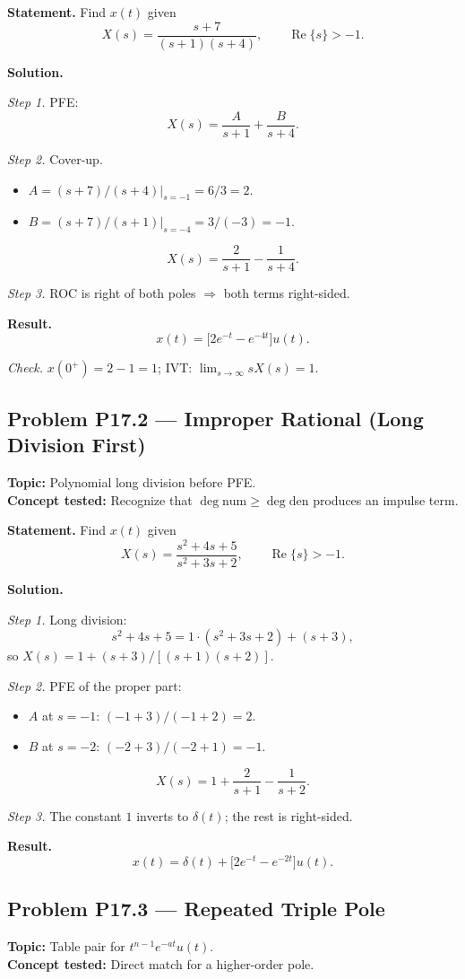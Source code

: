 \documentclass[11pt]{article}
\newcommand{\Real}{\operatorname{Re}}
\begin{document}
\textbf{Statement.} Find $x(t)$ given
\[
X(s) = \frac{s+7}{(s+1)(s+4)},\qquad \Real\{s\}>-1.
\]

\textbf{Solution.}

\textit{Step 1.} PFE:
\[
X(s) = \frac{A}{s+1}+\frac{B}{s+4}.
\]

\textit{Step 2.} Cover-up.
\begin{itemize}
\item $A = (s+7)/(s+4)\big|_{s=-1} = 6/3 = 2$.
\item $B = (s+7)/(s+1)\big|_{s=-4} = 3/(-3) = -1$.
\end{itemize}
\[
X(s) = \frac{2}{s+1} - \frac{1}{s+4}.
\]

\textit{Step 3.} ROC is right of both poles $\Rightarrow$ both terms right-sided.

\textbf{Result.}
\[
\boxed{\,x(t) = \bigl[2e^{-t} - e^{-4t}\bigr]u(t).\,}
\]

\textit{Check.} $x(0^{+}) = 2-1 = 1$; IVT: $\lim_{s\to\infty}sX(s) = 1$. \checkmark

\subsection{Problem P17.2 --- Improper Rational (Long Division First)}
\textbf{Topic:} Polynomial long division before PFE.\\
\textbf{Concept tested:} Recognize that $\deg\text{num}\ge\deg\text{den}$ produces an impulse term.

\textbf{Statement.} Find $x(t)$ given
\[
X(s) = \frac{s^{2}+4s+5}{s^{2}+3s+2},\qquad \Real\{s\}>-1.
\]

\textbf{Solution.}

\textit{Step 1.} Long division:
\[
s^{2}+4s+5 = 1\cdot(s^{2}+3s+2) + (s+3),
\]
so $X(s) = 1 + (s+3)/[(s+1)(s+2)]$.

\textit{Step 2.} PFE of the proper part:
\begin{itemize}
\item $A$ at $s=-1$: $(-1+3)/(-1+2) = 2$.
\item $B$ at $s=-2$: $(-2+3)/(-2+1) = -1$.
\end{itemize}
\[
X(s) = 1 + \frac{2}{s+1}-\frac{1}{s+2}.
\]

\textit{Step 3.} The constant $1$ inverts to $\delta(t)$; the rest is right-sided.

\textbf{Result.}
\[
\boxed{\,x(t) = \delta(t)+\bigl[2e^{-t}-e^{-2t}\bigr]u(t).\,}
\]

\subsection{Problem P17.3 --- Repeated Triple Pole}
\textbf{Topic:} Table pair for $t^{n-1}e^{-at}u(t)$.\\
\textbf{Concept tested:} Direct match for a higher-order pole.
\end{document}
